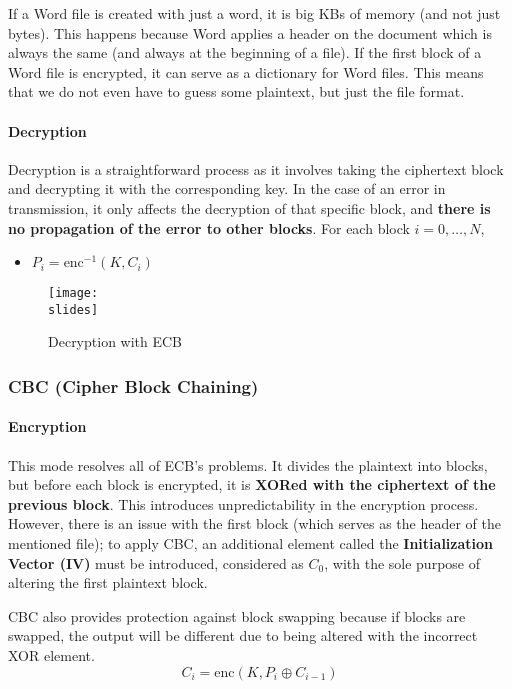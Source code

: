 If a Word file is created with just a word, it is big KBs of memory (and not just bytes). This happens because
Word applies a header on the document which is always the same (and always at the beginning of a file). If
the first block of a Word file is encrypted, it can serve as a dictionary for Word files. This means that we do not
even have to guess some plaintext, but just the file format.


\paragraph*{Decryption}
Decryption is a straightforward process as it involves taking the ciphertext block and decrypting it with the corresponding key. In the case of an error in transmission, it only affects the decryption of that specific block, and \textbf{there is no propagation of the error to other blocks}.
For each block \(i = 0, \ldots, N\), 
\begin{itemize}
    \item $P_i = \text{enc}^{-1}(K, C_i)$
\end{itemize}
\begin{figure}[h]
    \centering
    \texttt{[image: \\slides]}
    \caption*{Decryption with ECB}
\end{figure}


\subsubsection{CBC (Cipher Block Chaining)}

\paragraph*{Encryption}
This mode resolves all of ECB's problems.
It divides the plaintext into blocks, but before each block is encrypted, it is \textbf{XORed with the ciphertext of the previous block}. 
This introduces unpredictability in the encryption process.
However, there is an issue with the first block (which serves as the header of the mentioned file); to apply CBC, an additional element called the \textbf{Initialization Vector (IV)} must be introduced, considered as \(C_0\), with the sole purpose of altering the first plaintext block. 

CBC also provides protection against block swapping because if blocks are swapped, the output will be different due to being altered with the incorrect XOR element.
\[
C_i = \text{enc}(K, P_i \oplus C_{i-1})
\]

